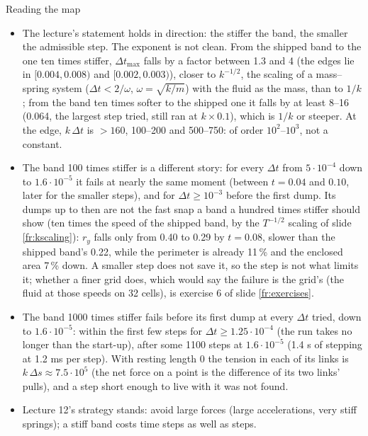 \documentclass[aspectratio=169,11pt]{beamer}
\begin{document}
\begin{frame}{Reading the map}
\label{fr:mapread}
\scriptsize
\begin{itemize}
  \item The lecture's statement holds in direction: the stiffer the band, the smaller the admissible step. The exponent is not clean. From the shipped band to the one ten times stiffer, $\Delta t_{\max}$ falls by a factor between 1.3 and 4 (the edges lie in $[0.004, 0.008)$ and $[0.002, 0.003)$), closer to $k^{-1/2}$, the scaling of a mass--spring system ($\Delta t < 2/\omega$, $\omega = \sqrt{k/m}$) with the fluid as the mass, than to $1/k$; from the band ten times softer to the shipped one it falls by at least 8--16 (0.064, the largest step tried, still ran at $k \times 0.1$), which is $1/k$ or steeper. At the edge, $k\,\Delta t$ is $> 160$, 100--200 and 500--750: of order $10^2$--$10^3$, not a constant.
  \item The band 100 times stiffer is a different story: for every $\Delta t$ from $5 \cdot 10^{-4}$ down to $1.6 \cdot 10^{-5}$ it fails at nearly the same moment (between $t = 0.04$ and $0.10$, later for the smaller steps), and for $\Delta t \ge 10^{-3}$ before the first dump. Its dumps up to then are not the fast snap a band a hundred times stiffer should show (ten times the speed of the shipped band, by the $T^{-1/2}$ scaling of slide \ref{fr:kscaling}): $r_y$ falls only from 0.40 to 0.29 by $t = 0.08$, slower than the shipped band's 0.22, while the perimeter is already 11\,\% and the enclosed area 7\,\% down. A smaller step does not save it, so the step is not what limits it; whether a finer grid does, which would say the failure is the grid's (the fluid at those speeds on 32 cells), is exercise 6 of slide \ref{fr:exercises}.
  \item The band 1000 times stiffer fails before its first dump at every $\Delta t$ tried, down to $1.6 \cdot 10^{-5}$: within the first few steps for $\Delta t \ge 1.25 \cdot 10^{-4}$ (the run takes no longer than the start-up), after some 1100 steps at $1.6 \cdot 10^{-5}$ (1.4 s of stepping at 1.2 ms per step). With resting length 0 the tension in each of its links is $k\,\Delta s \approx 7.5 \cdot 10^5$ (the net force on a point is the difference of its two links' pulls), and a step short enough to live with it was not found.
  \item Lecture 12's strategy stands: avoid large forces (large accelerations, very stiff springs); a stiff band costs time steps as well as steps.
\end{itemize}
\end{frame}
\end{document}

